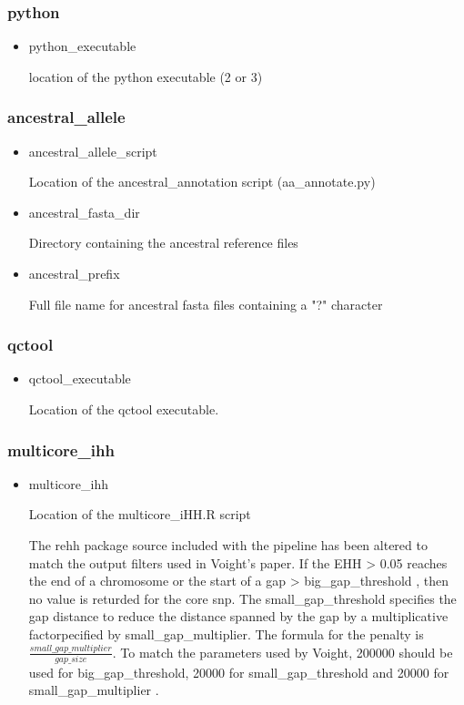 \subsubsection{python}
\begin{itemize}
\item python\_executable 

location of the python executable (2 or 3)
\end{itemize}
\subsubsection{ancestral\_allele}
\begin{itemize}
\item ancestral\_allele\_script

Location of the ancestral\_annotation script (aa\_annotate.py)
\item ancestral\_fasta\_dir 

Directory containing the ancestral reference files
\item ancestral\_prefix 

Full file name for ancestral fasta files containing a "?" character
\end{itemize}
\subsubsection{qctool}
\begin{itemize}
\item qctool\_executable

Location of the qctool executable.
\end{itemize}
\subsubsection{multicore\_ihh}
\begin{itemize}
\item multicore\_ihh

Location of the multicore\_iHH.R script

The rehh package source included with the pipeline has been altered to match the output filters used in Voight's paper. If the EHH > 0.05 reaches the end of a chromosome or the start of a gap > big\_gap\_threshold , then no value is returded for the core snp. The small\_gap\_threshold specifies the gap distance to reduce the distance spanned by the gap by a multiplicative factorpecified by small\_gap\_multiplier. The formula for the penalty is $\frac{small\_gap\_multiplier}{gap\_size}$. To match the parameters used by Voight, 200000 should be  used for big\_gap\_threshold, 20000 for small\_gap\_threshold and 20000 for small\_gap\_multiplier \citep{Voight:2006go}.

\end{itemize}

